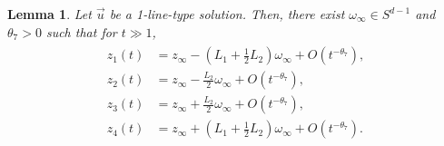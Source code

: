\documentclass[reqno]{amsart}
\theoremstyle{plain}
\newtheorem{lemma}[theorem]{Lemma}
\theoremstyle{definition}
\numberwithin{equation}{section}
\begin{document}
\begin{lemma}\label{1-line-type-asymp}
Let $\vec{u}$ be a 1-line-type solution. Then, there exist $\omega_{\infty}\in S^{d-1}$ and $\theta_7>0$ such that for $t\gg 1$,
\begin{align}\label{1-typeasumpes}
\begin{aligned}
z_1(t)&=z_{\infty}-\left(L_1+\frac{1}{2}L_2\right)\omega_{\infty}+O\left(t^{-\theta_7}\right),
\\
z_2(t)&=z_{\infty}-\frac{L_2}{2}\omega_{\infty}+O\left(t^{-\theta_7}\right),
\\
z_3(t)&=z_{\infty}+\frac{L_2}{2}\omega_{\infty}+O\left(t^{-\theta_7}\right),
\\
z_4(t)&=z_{\infty}+\left(L_1+\frac{1}{2}L_2\right)\omega_{\infty}+O\left(t^{-\theta_7}\right).
\end{aligned}
\end{align}
\end{lemma}
\end{document}
